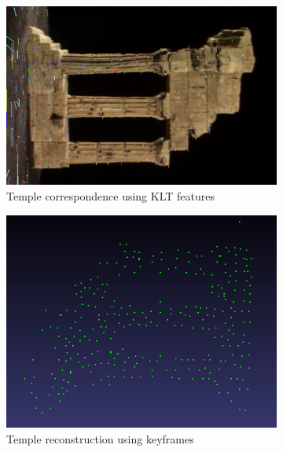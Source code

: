 \documentclass[12pt,twocolumn,letterpaper]{article}
\begin{document}
\begin{figure}
    \centering
    \begin{subfigure}{.30\textwidth}
        \includegraphics[width=\linewidth]{images/temple_correspondence}
        \caption{Temple correspondence using KLT features}
        \label{fig:correspondence}
    \end{subfigure}
    \begin{subfigure}{.25\textwidth}
        \includegraphics[width=\textwidth]{images/temple1}
        \caption{Temple reconstruction using keyframes}
        \label{fig:reconstruction}
    \end{subfigure}
    \begin{subfigure}{.3\textwidth}
        \centering

\end{subfigure}
\end{figure}
\end{document}

